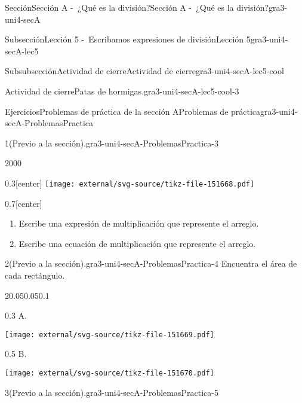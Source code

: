 \documentclass[twoside,10pt,]{article}
\begin{document}
\begin{sectionptx}{Sección}{Sección A -~¿Qué es la división?}{}{Sección A -~¿Qué es la división?}{}{}{gra3-uni4-secA}
\begin{subsectionptx}{Subsección}{Lección 5 -~Escribamos expresiones de división}{}{Lección 5}{}{}{gra3-uni4-secA-lec5}
\begin{subsubsectionptx}{Subsubsección}{Actividad de cierre}{}{Actividad de cierre}{}{}{gra3-uni4-secA-lec5-cool}
\begin{project}{Actividad de cierre}{Patas de hormigas.}{gra3-uni4-secA-lec5-cool-3}
\begin{enumerate}
\end{enumerate}
%
\end{project}%
\end{subsubsectionptx}
\end{subsectionptx}
%
%
\typeout{************************************************}
\typeout{************************************************}
%
\begin{exercises-subsection}{Ejercicios}{Problemas de práctica de la sección A}{}{Problemas de práctica}{}{}{gra3-uni4-secA-ProblemasPractica}
\begin{divisionexercise}{1}{(Previo a la sección).}{}{gra3-uni4-secA-ProblemasPractica-3}%
\begin{sidebyside}{2}{0}{0}{0}%
\begin{sbspanel}{0.3}[center]%
\texttt{[image: external/svg-source/tikz-file-151668.pdf]}
\end{sbspanel}%
\begin{sbspanel}{0.7}[center]%
%
\begin{enumerate}[label=(\alph*)]
\item{}Escribe una expresión de multiplicación que represente el arreglo.%
\item{}Escribe una ecuación de multiplicación que represente el arreglo.%
\end{enumerate}
%
\end{sbspanel}%
\end{sidebyside}%
\end{divisionexercise}%
\begin{divisionexercise}{2}{(Previo a la sección).}{}{gra3-uni4-secA-ProblemasPractica-4}%
Encuentra el área de cada rectángulo.%
\begin{sidebyside}{2}{0.05}{0.05}{0.1}%
\begin{sbspanel}{0.3}%
A.%
\par
\texttt{[image: external/svg-source/tikz-file-151669.pdf]}
\end{sbspanel}%
\begin{sbspanel}{0.5}%
B.%
\par
\texttt{[image: external/svg-source/tikz-file-151670.pdf]}
\end{sbspanel}%
\end{sidebyside}%
\end{divisionexercise}%
\begin{divisionexercise}{3}{(Previo a la sección).}{}{gra3-uni4-secA-ProblemasPractica-5}%

\end{divisionexercise}
\end{exercises-subsection}
\end{sectionptx}
\end{document}
